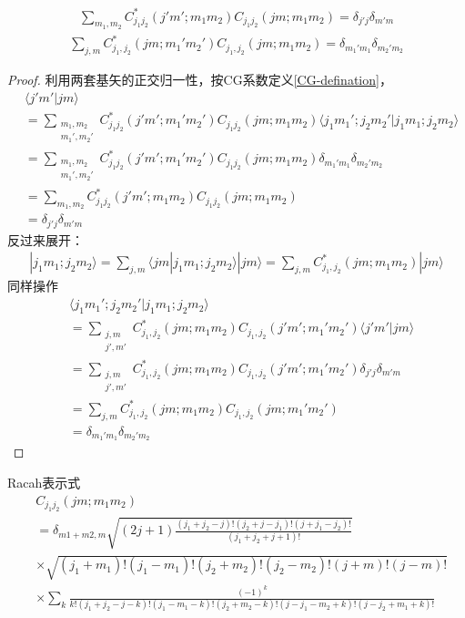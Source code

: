 \begin{theorem}[正交关系]
\begin{align*}
    \sum_{m_1,m_2} C^*_{j_1 j_2}(j'm';m_1m_2)C_{j_1 j_2}(jm;m_1m_2)= \delta_{j'j}\delta_{m'm}
\end{align*}
\begin{align*}
    \sum_{j,m}C^*_{j_1,j_2}(jm;m_1'm_2')C_{j_1,j_2}(jm;m_1m_2)= \delta_{m_1'm_1}\delta_{m_2'm_2}
\end{align*}
\end{theorem}
\begin{proof}
    利用两套基矢的正交归一性，按CG系数定义\ref{CG-defination}，
    \begin{align*}
        &\langle j'm'| jm\rangle \\
        &= \sum_{\substack{m_1,m_2\\m_1',m_2'}} C^*_{j_1 j_2}(j'm';m_1'm_2')C_{j_1 j_2}(jm;m_1m_2)\langle j_1 m_1';j_2 m_2'|j_1 m_1;j_2 m_2\rangle\\
&= \sum_{\substack{m_1,m_2\\m_1',m_2'}} C^*_{j_1 j_2}(j'm';m_1'm_2')C_{j_1 j_2}(jm;m_1m_2)\delta_{m_1' m_1}\delta_{m_2' m_2}\\
&= \sum_{m_1,m_2} C^*_{j_1 j_2}(j'm';m_1m_2)C_{j_1 j_2}(jm;m_1m_2)\\
&= \delta_{j'j}\delta_{m'm}
    \end{align*}
    反过来展开：
    \begin{align*}
        |j_1 m_1;j_2 m_2\rangle = \sum_{j,m}\langle jm|j_1 m_1;j_2 m_2 \rangle|jm\rangle= \sum_{j,m}C^*_{j_1,j_2}(jm;m_1m_2)|jm\rangle
    \end{align*}
    同样操作
    \begin{align*}
        &\langle j_1 m_1';j_2 m_2'|j_1 m_1;j_2 m_2\rangle\\
        &= \sum_{\substack{j,m\\j',m'}}C^*_{j_1,j_2}(jm;m_1m_2)C_{j_1,j_2}(j'm';m_1'm_2')\langle j'm'|jm\rangle\\
&= \sum_{\substack{j,m\\j',m'}}C^*_{j_1,j_2}(jm;m_1m_2)C_{j_1,j_2}(j'm';m_1'm_2')\delta_{j'j}\delta_{m'm}\\
&= \sum_{j,m}C^*_{j_1,j_2}(jm;m_1m_2)C_{j_1,j_2}(jm;m_1'm_2')\\
&= \delta_{m_1'm_1}\delta_{m_2'm_2}
    \end{align*}
\end{proof}
\begin{theorem}
Racah表示式
\begin{align*}
    &C_{j_1j_2}(j m;m_1 m_2) \\
    &= \delta_{m1+m2,m}\sqrt{(2j+1)\frac{(j_1+j_2-j)!(j_2+j-j_1)!(j+j_1-j_2)!}{(j_1+j_2+j+1)!}}\\
    &\times\sqrt{(j_1+m_1)!(j_1-m_1)!(j_2+m_2)!(j_2-m_2)!(j+m)!(j-m)!}\\
    &\times\sum_{k}\frac{(-1)^{k}}{k!(j_1+j_2-j-k)!(j_1-m_1-k)!(j_2+m_2-k)!(j-j_1-m_2+k)!(j-j_2+m_1+k)!}
\end{align*}
\end{theorem}
